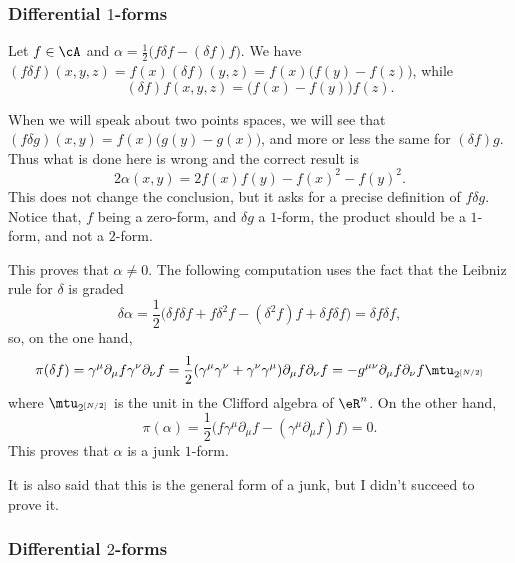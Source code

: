 \subsubsection{Differential \texorpdfstring{$1$}{1}-forms}

Let $f\in\cA$ and
$\alpha=\frac{ 1 }{2}\big( f\delta f-(\delta f)f \big)$.
We have
$(f\delta f)(x,y,z)=f(x)(\delta f)(y,z)
	=f(x)\big( f(y)-f(z) \big)$,
while
\[
	(\delta f)f(x,y,z)=\big( f(x)-f(y) \big)f(z).
\]

\begin{probleme}
	When we will speak about two points spaces, we will see that $(f\delta g)(x,y)=f(x)\big( g(y)-g(x) \big)$, and more or less the same for $(\delta f)g$. Thus what is done here is wrong and the correct result is
	\[
		2\alpha(x,y)=2f(x)f(y)-f(x)^{2}-f(y)^{2}.
	\]
	This does not change the conclusion, but it asks for a precise definition of $f\delta g$. Notice that, $f$ being a zero-form, and $\delta g$ a $1$-form, the product should be a $1$-form, and not a $2$-form.
\end{probleme}

This proves that $\alpha\neq 0$. The following computation uses the fact that the Leibniz rule for $\delta$ is graded
\[
	\delta\alpha=\frac{ 1 }{2}\big( \delta f\delta f+f\delta^2 f-(\delta^2 f)f+\delta f\delta f \big)
	=\delta f\delta f,
\]
so, on the one hand,
\[
	\pi(\delta f)=\gamma^{\mu}\partial_{\mu}f\gamma^{\nu}\partial_{\nu}f
	=\frac{ 1 }{2}(\gamma^{\mu}\gamma^{\nu}+\gamma^{\nu}\gamma^{\mu})\partial_{\mu}f\partial_{\nu}f
	=-g^{\mu\nu}\partial_{\mu}f\partial_{\nu}f \mtu_{2^{[N/2]}}
\]
where $\mtu_{2^{[N/2]}}$ is the unit in the Clifford algebra of $\eR^n$. On the other hand,
\[
	\pi(\alpha)=\frac{ 1 }{2}\big( f\gamma^{\mu}\partial_{\mu}f-(\gamma^{\mu}\partial_{\mu}f)f \big)=0.
\]
This proves that $\alpha$ is a junk $1$-form.

\begin{probleme}
	It is also said that this is the general form of a junk, but I didn't succeed to prove it.
\end{probleme}

\subsubsection{Differential \texorpdfstring{$2$}{2}-forms}

